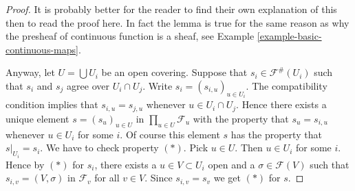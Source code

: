 \begin{proof}
It is probably better for the reader to find their own explanation
of this then to read the proof here. In fact the lemma is true
for the same reason as why the presheaf of continuous
function is a sheaf, see Example \ref{example-basic-continuous-maps}.

\medskip\noindent
Anyway, let $U = \bigcup U_i$ be an open covering.
Suppose that $s_i \in \mathcal{F}^{\#}(U_i)$
such that $s_i$ and $s_j$ agree over $U_i \cap U_j$. Write
$s_i = (s_{i,u})_{u\in U_i}$. The compatibility condition implies that
$s_{i, u} = s_{j, u}$ whenever $u \in U_i \cap U_j$. 
Hence there exists a unique element $s = (s_u)_{u\in U}$
in $\prod_{u\in U} \mathcal{F}_u$ with the property that
$s_u = s_{i, u}$ whenever $u \in U_i$ for some $i$. Of course this
element $s$ has the property that $s|_{U_i} = s_i$.
We have to check property $(*)$. Pick $u \in U$.
Then $u \in U_i$ for some $i$. Hence by $(*)$ for $s_i$,
there exists a $u \in V \subset U_i$ open and a $\sigma \in \mathcal{F}(V)$
such that $s_{i, v} = (V, \sigma)$ in $\mathcal{F}_v$ 
for all $v \in V$. Since $s_{i,v} = s_v$ we get $(*)$ for
$s$.
\end{proof}










